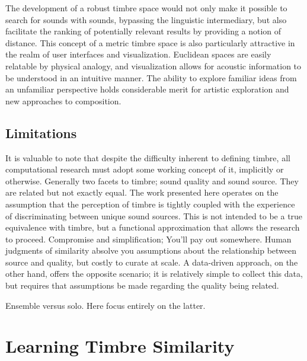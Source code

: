 The development of a robust timbre space would not only make it possible to search for sounds with sounds, bypassing the linguistic intermediary, but also facilitate the ranking of potentially relevant results by providing a notion of distance.
This concept of a metric timbre space is also particularly attractive in the realm of user interfaces and visualization.
Euclidean spaces are easily relatable by physical analogy, and visualization allows for acoustic information to be understood in an intuitive manner.
The ability to explore familiar ideas from an unfamiliar perspective holds considerable merit for artistic exploration and new approaches to composition.


\subsection{Limitations}

It is valuable to note that despite the difficulty inherent to defining timbre, all computational research must adopt some working concept of it, implicitly or otherwise.
Generally two facets to timbre; sound quality and sound source.
They are related but not exactly equal.
The work presented here operates on the assumption that the perception of timbre is tightly coupled with the experience of discriminating between unique sound sources.
This is not intended to be a true equivalence with timbre, but a functional approximation that allows the research to proceed.
Compromise and simplification; You'll pay out somewhere.
Human judgments of similarity absolve you assumptions about the relationship between source and quality, but costly to curate at scale.
A data-driven approach, on the other hand, offers the opposite scenario; it is relatively simple to collect this data, but requires that assumptions be made regarding the quality being related.

Ensemble versus solo.
Here focus entirely on the latter.




\section{Learning Timbre Similarity}
\label{sec:timbre_similarity}

